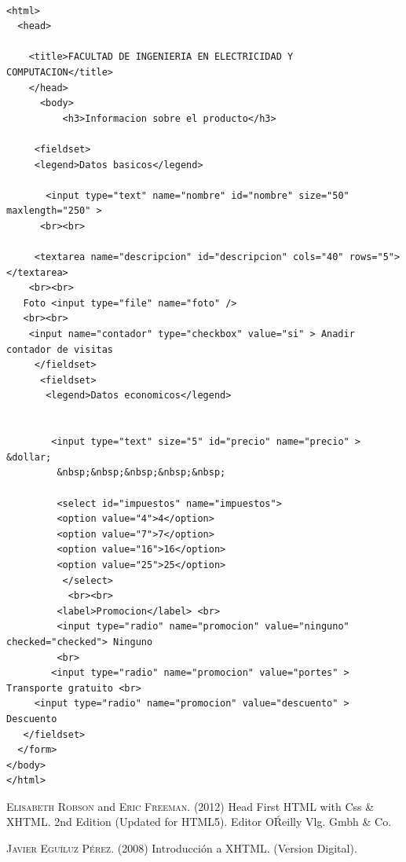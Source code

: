 \documentclass[11pt]{article} %
\begin{document}
\begin{lstlisting}[frame=single]  % Start your code-block

<html>
  <head>

    <title>FACULTAD DE INGENIERIA EN ELECTRICIDAD Y COMPUTACION</title>
    </head>
      <body>
          <h3>Informacion sobre el producto</h3>

     <fieldset>
     <legend>Datos basicos</legend>

       <input type="text" name="nombre" id="nombre" size="50" maxlength="250" >
      <br><br>

     <textarea name="descripcion" id="descripcion" cols="40" rows="5"></textarea>
    <br><br>
   Foto <input type="file" name="foto" />
   <br><br>
    <input name="contador" type="checkbox" value="si" > Anadir contador de visitas
     </fieldset>
      <fieldset>
       <legend>Datos economicos</legend>


        <input type="text" size="5" id="precio" name="precio" > &dollar;
         &nbsp;&nbsp;&nbsp;&nbsp;&nbsp;

         <select id="impuestos" name="impuestos">
         <option value="4">4</option>
         <option value="7">7</option>
         <option value="16">16</option>
         <option value="25">25</option>
          </select>
           <br><br>
         <label>Promocion</label> <br>
         <input type="radio" name="promocion" value="ninguno" checked="checked"> Ninguno
         <br>
        <input type="radio" name="promocion" value="portes" > Transporte gratuito <br>
     <input type="radio" name="promocion" value="descuento" > Descuento 
   </fieldset>
  </form>
</body>
</html>
\end{lstlisting}




\begin{thebibliography}{X}
 \textsc{Elisabeth Robson} and \textsc{Eric Freeman}. (2012) Head First HTML with Css \& XHTML.
2nd Edition (Updated for HTML5). Editor O\'Reilly Vlg. Gmbh \& Co.

 \textsc{Javier Eguíluz Pérez}. (2008) Introducción a XHTML. (Version Digital).
\end{thebibliography}
\end{document}

